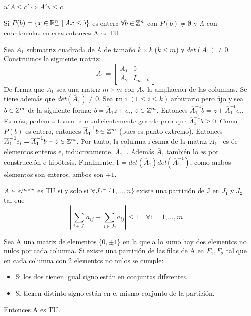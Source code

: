 \documentclass[PM.tex]{subfiles}
\begin{document}
\begin{dem}
$u'A \leq c' \Leftrightarrow A'u \leq c$. \QED
\end{dem}
\begin{theorem}
Si $P(b)=\{x\in\mathbb{R}^n_+ \mid Ax\leq b\}$ es entero $\forall b\in\mathbb{Z}^n$ con $P(b)\neq\emptyset$ y $A$ con coordenadas enteras entonces A es TU.
\end{theorem}
\begin{dem}
Sea $A_1$ submatriz cuadrada de A de tamaño $k\times k$ ($ k \leq m$) y $det(A_1)\neq 0$. Construimos la siguiente matriz:
\[
\overline{A}_1 = 
\begin{bmatrix}
A_1 & 0\\
A_2 & I_{m-k}
\end{bmatrix}
\]
De forma que $\overline{A}_1$ sea una matriz $m\times m$ con $A_2$ la ampliación de las columnas. Se tiene además que $det(\overline{A}_1)\neq 0$. Sea un i $(1\leq i \leq k)$ arbitrario pero fijo y sea $b\in \mathbb{Z}^m$ de la siguiente forma: $b=\overline{A}_1 z + e_i$, $z\in\mathbb{Z}^m_+$. Entonces $\overline{A}_1^{-1}b=z+\overline{A}_1^{-1}e_i$. Es más, podemos tomar $z$ lo suficientemente grande para que $\overline{A}_1^{-1} b\geq 0$. Como $P(b)$ es entero, entonces $\overline{A}_1^{-1}b \in \mathbb{Z}^m$ (pues es punto extremo). Entonces $ \overline{A}_1^{-1}e_i=\overline{A}_1^{-1}b-z\in\mathbb{Z}^m$. Por tanto, la columna i-ésima de la matriz $\overline{A}_1^{-1}$ es de elementos enteros e, inductivamente, $\overline{A}_1^{-1}$. Además $\overline{A}_1$ también lo es por construcción e hipótesis. Finalmente, $1 = det(\overline{A}_1)det(\overline{A}_1^{-1})$, como ambos elementos son enteros, ambos son $\pm 1$. \QED
\end{dem}
\begin{theorem}
$A\in\mathbb{Z}^{m\times n}$ es TU si y solo si $\forall J\subset\{1,\dotsc,n\}$ existe una partición de J en $J_1$ y $J_2$ tal que 
\[
\left| \sum_{j\in J_1}a_{ij}-\sum_{j\in J_2}a_{ij} \right| \leq 1 \quad \forall i=1,\dotsc,m
\]
\end{theorem}
\begin{prop}\label{propo}
Sea A una matriz de elementos $\{0,\pm1\}$ en la que a lo sumo hay dos elementos no nulos por cada columna. Si existe una partición de las filas de A en $F_1,F_2$ tal que en cada columna con 2 elementos no nulos se cumple:
\begin{itemize}
\item Si los dos tienen igual signo están en conjuntos diferentes.
\item Si tienen distinto signo están en el mismo conjunto de la partición.
\end{itemize}
Entonces A es TU.
\end{prop}
\end{document}
